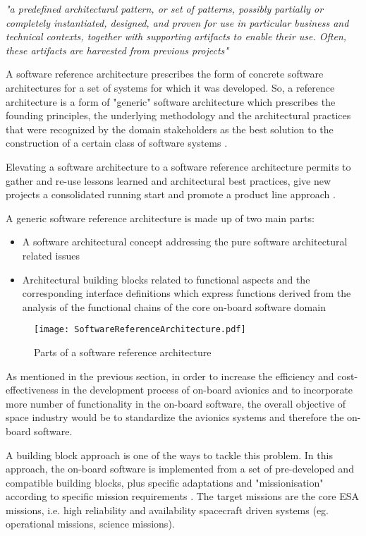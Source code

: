 \textit{"a predefined architectural pattern, or set of patterns, possibly partially or
completely instantiated, designed, and proven for use in particular business and technical contexts, together with supporting artifacts to enable their use. Often, these artifacts are harvested
from previous projects"} 

A software reference architecture prescribes the form of concrete software architectures for a set of systems for which it was developed. So, a reference architecture is a form of "generic" software architecture which prescribes the founding principles, the underlying methodology and the architectural practices that were recognized by the domain stakeholders as the best solution to the construction of a certain class of software systems \cite{PhdThesis,SoftRefArch}.

Elevating a software architecture to a software reference architecture permits to gather and re-use lessons learned and architectural best practices, give new projects a consolidated running start and promote a product line approach \cite{SAVOIR}.

A generic software reference architecture is made up of two main parts: \cite{SAVOIR}

\begin{itemize}
\item A software architectural concept addressing the pure software architectural related issues
\item Architectural building blocks related to functional aspects and the corresponding interface definitions which express functions derived from the analysis of the functional chains of the core on-board software domain 
\end{itemize}

\begin{figure}[h]
	\centering
	\texttt{[image: SoftwareReferenceArchitecture.pdf]}
	\caption{Parts of a software reference architecture}
	\label{}
\end{figure} 

As mentioned in the previous section, in order to increase the efficiency and cost-effectiveness in the development process of on-board avionics and to incorporate more number of functionality in the on-board software, the overall objective of space industry would be to standardize the avionics systems and therefore the on-board software.

A building block approach is one of the ways to tackle this problem. In this approach, the on-board software is implemented from a set of pre-developed and compatible building blocks, plus specific adaptations and "missionisation" according to specific mission requirements \cite{SAVOIR}. The target missions are the core ESA missions, i.e. high reliability and availability spacecraft driven systems (eg. operational missions, science missions).

